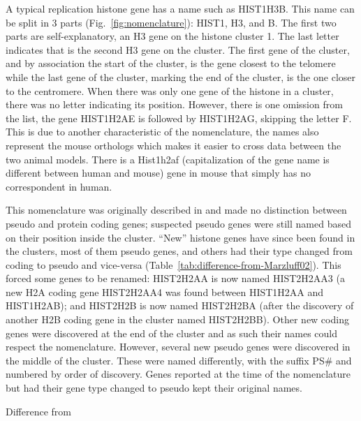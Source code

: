 \documentclass[10pt,a4paper,draft,article]{memoir}
\begin{document}
      A typical replication histone gene has a name such as HIST1H3B. This name can be split in
      3 parts (Fig.~\ref{fig:nomenclature}): HIST1, H3, and B. The first two parts are self-explanatory,
      an H3 gene on the histone cluster 1. The last letter indicates that is the second H3 gene on the cluster.
      The first gene of the cluster, and by association the start of the cluster, is the gene closest to the telomere
      while the last gene of the cluster, marking the end of the cluster, is the one closer to the centromere. When
      there was only one gene of the histone in a cluster, there was no letter indicating its position. However, there is
      one omission from the list, the gene HIST1H2AE is followed by HIST1H2AG, skipping the letter F. This is due
      to another characteristic of the nomenclature, the names also represent the mouse orthologs which makes it easier
      to cross data between the two animal models. There is a Hist1h2af (capitalization
      of the gene name is different between human and mouse) gene in mouse that simply has no correspondent in human.

      This nomenclature was originally described in \cite{Marzluff02} and made no distinction between
      pseudo and protein coding genes; suspected pseudo genes were still named based on their position
      inside the cluster. ``New'' histone genes have since been found in the clusters,
      most of them pseudo genes, and others had their type changed from coding to pseudo and
      vice-versa (Table~\ref{tab:difference-from-Marzluff02}).
      This forced some genes to be renamed: HIST2H2AA is now named HIST2H2AA3 (a new H2A coding gene
      HIST2H2AA4 was found between HIST1H2AA and HIST1H2AB);
      and HIST2H2B is now named HIST2H2BA (after the discovery of another H2B coding gene in the
      cluster named HIST2H2BB).
      Other new coding genes were discovered at the end of the cluster and as such their names could respect the nomenclature. However,
      several new pseudo genes were discovered in the middle of the cluster. These were named differently, with the suffix PS\#
      and numbered by order of discovery. Genes reported at the time of the nomenclature but had their gene type changed to pseudo
      kept their original names.

      \begin{table}
        \caption{Difference from \cite{Marzluff02}}
        \label{tab:difference-from-Marzluff02}
        \centering
        
      \end{table}
\end{document}
